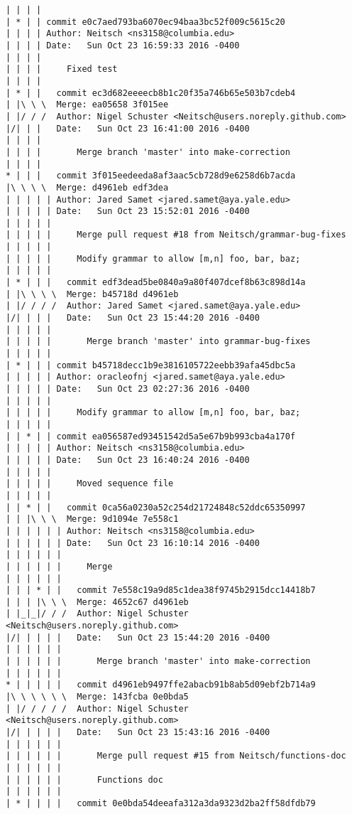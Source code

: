\begin{lstlisting}
| | | |     
| * | | commit e0c7aed793ba6070ec94baa3bc52f009c5615c20
| | | | Author: Neitsch <ns3158@columbia.edu>
| | | | Date:   Sun Oct 23 16:59:33 2016 -0400
| | | | 
| | | |     Fixed test
| | | |       
| * | |   commit ec3d682eeeecb8b1c20f35a746b65e503b7cdeb4
| |\ \ \  Merge: ea05658 3f015ee
| |/ / /  Author: Nigel Schuster <Neitsch@users.noreply.github.com>
|/| | |   Date:   Sun Oct 23 16:41:00 2016 -0400
| | | |   
| | | |       Merge branch 'master' into make-correction
| | | |       
* | | |   commit 3f015eedeeda8af3aac5cb728d9e6258d6b7acda
|\ \ \ \  Merge: d4961eb edf3dea
| | | | | Author: Jared Samet <jared.samet@aya.yale.edu>
| | | | | Date:   Sun Oct 23 15:52:01 2016 -0400
| | | | | 
| | | | |     Merge pull request #18 from Neitsch/grammar-bug-fixes
| | | | |     
| | | | |     Modify grammar to allow [m,n] foo, bar, baz;
| | | | |        
| * | | |   commit edf3dead5be0840a9a80f407dcef8b63c898d14a
| |\ \ \ \  Merge: b45718d d4961eb
| |/ / / /  Author: Jared Samet <jared.samet@aya.yale.edu>
|/| | | |   Date:   Sun Oct 23 15:44:20 2016 -0400
| | | | |   
| | | | |       Merge branch 'master' into grammar-bug-fixes
| | | | |      
| * | | | commit b45718decc1b9e3816105722eebb39afa45dbc5a
| | | | | Author: oracleofnj <jared.samet@aya.yale.edu>
| | | | | Date:   Sun Oct 23 02:27:36 2016 -0400
| | | | | 
| | | | |     Modify grammar to allow [m,n] foo, bar, baz;
| | | | |      
| | * | | commit ea056587ed93451542d5a5e67b9b993cba4a170f
| | | | | Author: Neitsch <ns3158@columbia.edu>
| | | | | Date:   Sun Oct 23 16:40:24 2016 -0400
| | | | | 
| | | | |     Moved sequence file
| | | | |        
| | * | |   commit 0ca56a0230a52c254d21724848c52ddc65350997
| | |\ \ \  Merge: 9d1094e 7e558c1
| | | | | | Author: Neitsch <ns3158@columbia.edu>
| | | | | | Date:   Sun Oct 23 16:10:14 2016 -0400
| | | | | | 
| | | | | |     Merge
| | | | | |         
| | | * | |   commit 7e558c19a9d85c1dea38f9745b2915dcc14418b7
| | | |\ \ \  Merge: 4652c67 d4961eb
| |_|_|/ / /  Author: Nigel Schuster <Neitsch@users.noreply.github.com>
|/| | | | |   Date:   Sun Oct 23 15:44:20 2016 -0400
| | | | | |   
| | | | | |       Merge branch 'master' into make-correction
| | | | | |         
* | | | | |   commit d4961eb9497ffe2abacb91b8ab5d09ebf2b714a9
|\ \ \ \ \ \  Merge: 143fcba 0e0bda5
| |/ / / / /  Author: Nigel Schuster <Neitsch@users.noreply.github.com>
|/| | | | |   Date:   Sun Oct 23 15:43:16 2016 -0400
| | | | | |   
| | | | | |       Merge pull request #15 from Neitsch/functions-doc
| | | | | |       
| | | | | |       Functions doc
| | | | | |         
| * | | | |   commit 0e0bda54deeafa312a3da9323d2ba2ff58dfdb79

\end{lstlisting}
